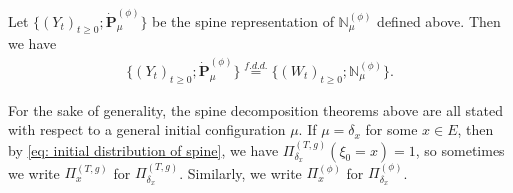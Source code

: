 \begin{cor}
	Let $\{(Y_t)_{t\geq 0}; \dot {\mathbf P}^{(\phi)}_\mu\}$ be the spine representation of $\mathbb N^{(\phi)}_\mu$ defined above.
	Then we have
\begin{align}
	\{(Y_t)_{t\geq 0}; \dot{\mathbf P}^{(\phi)}_\mu\}
	\overset{f.d.d.}{=} \{(W_t)_{t\geq 0}; \mathbb N_\mu^{(\phi)}\}.
\end{align}
\end{cor}

	For the sake of generality, the spine decomposition theorems above are all stated with respect to a general initial configuration $\mu$.
	If $\mu = \delta_x$ for some $x\in E$, then by \eqref{eq: initial distribution of spine}, we have $\Pi_{\delta_x}^{(T,g)} (\xi_0 = x) = 1$, so sometimes we write $\Pi_x^{(T,g)}$ for $\Pi_{\delta_x}^{(T,g)}$.
	Similarly, we write $\Pi_x^{(\phi)}$ for $\Pi_{\delta_x}^{(\phi)}$.

